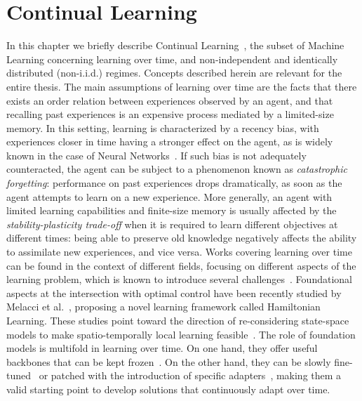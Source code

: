 \chapter{Continual Learning}
\label{chap:continual}

In this chapter we briefly describe Continual Learning~\cite{de2021continual}, the subset of Machine Learning concerning learning over time, and non-independent and identically distributed (non-i.i.d.) regimes. Concepts described herein are relevant for the entire thesis.
The main assumptions of learning over time are the facts that there exists an order relation between experiences observed by an agent, and that recalling past experiences is an expensive process mediated by a limited-size memory. In this setting, learning is characterized by a recency bias, with experiences closer in time having a stronger effect on the agent, as is widely known in the case of Neural Networks~\cite{PARISI201954}.
If such bias is not adequately counteracted, the agent can be subject to a phenomenon known as \textit{catastrophic forgetting}: performance on past experiences drops dramatically, as soon as the agent attempts to learn on a new experience.
More generally, an agent with limited learning capabilities and finite-size memory is usually affected by the \textit{stability-plasticity trade-off} when it is required to learn different objectives at different times: being able to preserve old knowledge negatively affects the ability to assimilate new experiences, and vice versa. 
%
Works covering learning over time can be found in the context of different fields, focusing on different aspects of the learning problem, which is known to introduce several challenges~\cite{casoni2024pitfalls}. Foundational aspects at the intersection with optimal control have been recently studied by Melacci et al.~\cite{melacci2024unified}, proposing a novel learning framework called Hamiltonian Learning. These studies point toward the direction of re-considering state-space models to make spatio-temporally local learning feasible~\cite{tiezzi2025back}. The role of foundation models is multifold in learning over time. On one hand, they offer useful backbones that can be kept frozen~\cite{zhou2024continual}. On the other hand, they can be slowly fine-tuned~\cite{zhang2023slca} or patched with the introduction of specific adapters~\cite{graziuso2024task}, making them a valid starting point to develop solutions that continuously adapt over time.

